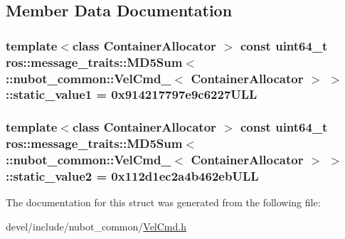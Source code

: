 \subsection{Member Data Documentation}
\hypertarget{structros_1_1message__traits_1_1MD5Sum_3_01_1_1nubot__common_1_1VelCmd___3_01ContainerAllocator_01_4_01_4_abd3f20b933d4021c31dc4f5885b19215}{
\subsubsection[{static\-\_\-value1}]{\setlength{\rightskip}{0pt plus 5cm}template$<$class Container\-Allocator $>$ const uint64\-\_\-t ros\-::message\-\_\-traits\-::\-M\-D5\-Sum$<$ \-::{\bf nubot\-\_\-common\-::\-Vel\-Cmd\-\_\-}$<$ Container\-Allocator $>$ $>$\-::static\-\_\-value1 = 0x914217797e9c6227\-U\-L\-L\hspace{0.3cm}{\ttfamily [static]}}}\label{structros_1_1message__traits_1_1MD5Sum_3_01_1_1nubot__common_1_1VelCmd___3_01ContainerAllocator_01_4_01_4_abd3f20b933d4021c31dc4f5885b19215}
\hypertarget{structros_1_1message__traits_1_1MD5Sum_3_01_1_1nubot__common_1_1VelCmd___3_01ContainerAllocator_01_4_01_4_a51412744eafb39eb84c4d92be08f4ce9}{
\subsubsection[{static\-\_\-value2}]{\setlength{\rightskip}{0pt plus 5cm}template$<$class Container\-Allocator $>$ const uint64\-\_\-t ros\-::message\-\_\-traits\-::\-M\-D5\-Sum$<$ \-::{\bf nubot\-\_\-common\-::\-Vel\-Cmd\-\_\-}$<$ Container\-Allocator $>$ $>$\-::static\-\_\-value2 = 0x112d1ec2a4b462eb\-U\-L\-L\hspace{0.3cm}{\ttfamily [static]}}}\label{structros_1_1message__traits_1_1MD5Sum_3_01_1_1nubot__common_1_1VelCmd___3_01ContainerAllocator_01_4_01_4_a51412744eafb39eb84c4d92be08f4ce9}


The documentation for this struct was generated from the following file\-:\begin{DoxyCompactItemize}
\item 
devel/include/nubot\-\_\-common/\hyperlink{VelCmd_8h}{Vel\-Cmd.\-h}\end{DoxyCompactItemize}
